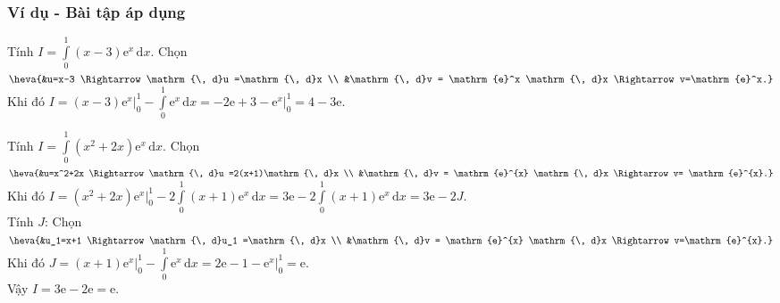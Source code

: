\subsubsection{Ví dụ - Bài tập áp dụng}
\begin{vd}%
    Tính $I=\displaystyle\int\limits_0^{1} (x-3) \mathrm{e}^x \mathrm{\, d}x$.
    \loigiai
    {
    Chọn $\heva{&u=x-3 \Rightarrow \mathrm{\, d}u =\mathrm{\, d}x \\ &\mathrm{\, d}v = \mathrm{e}^x \mathrm{\, d}x \Rightarrow v=\mathrm{e}^x.}$\\
    Khi đó $I= (x-3)\mathrm{e}^x\Big|_0^1 - \displaystyle\int\limits_0^{1} \mathrm{e}^x \mathrm{\, d}x = -2\mathrm{e}+3 - \mathrm{e}^x \Big|_0^1 = 4-3\mathrm{e}$.
    }
    \end{vd}
    
     \begin{vd}%
    Tính $I=\displaystyle\int\limits_0^{1} (x^2+2x)\mathrm{e}^{x} \mathrm{\, d}x$.
    \loigiai
    {
    Chọn $\heva{&u=x^2+2x \Rightarrow \mathrm{\, d}u =2(x+1)\mathrm{\, d}x \\ &\mathrm{\, d}v = \mathrm{e}^{x} \mathrm{\, d}x \Rightarrow v= \mathrm{e}^{x}.}$\\
    Khi đó $I=(x^2+2x)\mathrm{e}^{x} \Big|_0^1 -2\displaystyle\int\limits_0^{1} (x+1)\mathrm{e}^{x} \mathrm{\, d}x = 3\mathrm{e}-
    2\displaystyle\int\limits_0^{1} (x+1)\mathrm{e}^{x} \mathrm{\, d}x =3\mathrm{e}-2J$.\\
    Tính $J$:
    Chọn $\heva{&u_1=x+1 \Rightarrow \mathrm{\, d}u_1 =\mathrm{\, d}x \\ &\mathrm{\, d}v = \mathrm{e}^{x} \mathrm{\, d}x \Rightarrow v=\mathrm{e}^{x}.}$\\
    Khi đó $J=(x+1)\mathrm{e}^{x} \Big|_0^1 -\displaystyle\int\limits_0^{1} \mathrm{e}^{x} \mathrm{\, d}x = 2\mathrm{e}-1-\mathrm{e}^{x} \Big|_0^1 = \mathrm{e}$.\\
    Vậy $I=3\mathrm{e}-2\mathrm{e}=\mathrm{e}$.
    }
    \end{vd}
    
